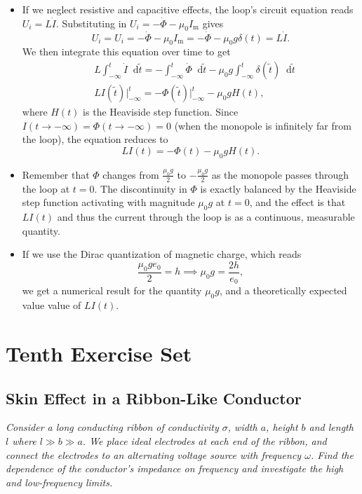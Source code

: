 \documentclass[11pt, a4paper]{article}
\newcommand{\diff}{\mathop{}\!\mathrm{d}} %
\renewcommand{\vec}[1]{\bm{#1}} %
\renewcommand{\t}[1]{\tilde{#1}} %
\newcommand{\mm}{\mu_{0}}  %
\newcommand{\m}{\vec{m}}  %
\begin{document}
\begin{itemize}
	\item If we neglect resistive and capacitive effects, the loop's circuit equation reads $ U_{i} = L \dot{I} $. Substituting in $  U_{i} = - \dot{\Phi} - \mm I_{\text{m}} $ gives
	\begin{equation*}
		U_{i} =  U_{i} = - \dot{\Phi} - \mm I_{\text{m}} = - \dot{\Phi} - \mm g \delta (t) = L \dot{I}.
	\end{equation*}
	We then integrate this equation over time to get
	\begin{align*}
		&L \int_{-\infty}^{t}\dot{I}\diff \t{t} = - \int_{-\infty}^{t} \dot{\Phi} \diff \t{t} - \mm g \int_{-\infty}^{t} \delta(\t{t})\diff \t{t}\\
		&LI(\t{t}) \Big |_{-\infty}^{t} = - \Phi(\t{t}) \Big|_{-\infty}^{t} - \mm g H(t),
	\end{align*}
	where $ H(t) $ is the Heaviside step function. Since $ I(t \to -\infty) = \Phi(t \to -\infty) = 0 $ (when the monopole is infinitely far from the loop), the equation reduces to
	\begin{equation*}
		LI(t) = - \Phi(t)  - \mm gH(t).
	\end{equation*}
	
	\item Remember that $ \Phi $ changes from $ \frac{\mm g}{2} $ to $ -\frac{\mm g}{2} $ as the monopole passes through the loop at $ t = 0 $. The discontinuity in $ \Phi $ is exactly balanced by the Heaviside step function activating with magnitude $ \mm g $ at $ t = 0 $, and the effect is that $ LI(t) $ and thus the current through the loop is as a continuous, measurable quantity. 
	
	\item If we use the Dirac quantization of magnetic charge, which reads
	\begin{equation*}
		\frac{\mm g e_{0}}{2} = h \implies \mm g = \frac{2h}{e_{0}},
	\end{equation*}
	we get a numerical result for the quantity $ \mm g $, and a theoretically expected value value of $ LI(t) $.
\end{itemize}


\section{Tenth Exercise Set}

\subsection{Skin Effect in a Ribbon-Like Conductor}
\textit{Consider a long conducting ribbon of conductivity $ \sigma $, width $ a $, height $ b $ and length $ l $ where $ l \gg b \gg a $. We place ideal electrodes at each end of the ribbon, and connect the electrodes to an alternating voltage source with frequency $ \omega $. Find the dependence of the conductor's impedance on frequency and investigate the high and low-frequency limits.}
\end{document}
